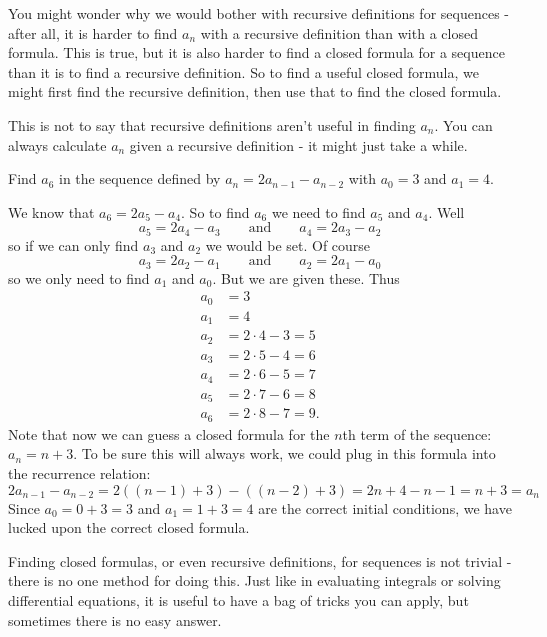 \documentclass[12pt]{article}
\begin{document}
You might wonder why we would bother with recursive definitions for sequences - after all, it is harder to find $a_n$ with a recursive definition than with a closed formula.  This is true, but it is also harder to find a closed formula for a sequence than it is to find a recursive definition.  So to find a useful closed formula, we might first find the recursive definition, then use that to find the closed formula.  

This is not to say that recursive definitions aren't useful in finding $a_n$.  You can always calculate $a_n$ given a recursive definition - it might just take a while.

\begin{example}
 Find $a_6$ in the sequence defined by $a_n = 2a_{n-1} - a_{n-2}$ with $a_0 = 3$ and $a_1 = 4$.  
 \begin{solution}
  We know that $a_6 = 2a_5 - a_4$.  So to find $a_6$ we need to find $a_5$ and $a_4$.  Well \[a_5 = 2a_4 - a_3 \qquad \mbox{and} \qquad a_4 = 2a_3 - a_2\]
  so if we can only find $a_3$ and $a_2$ we would be set.  Of course
  \[a_3 = 2a_2 - a_1 \qquad \mbox{and} \qquad a_2 = 2a_1 - a_0\]
  so we only need to find $a_1$ and $a_0$.  But we are given these.  Thus
  \begin{align*}
   a_0 & = 3 \\
   a_1 & = 4 \\
   a_2 & = 2\cdot 4 - 3 = 5\\
   a_3 & = 2\cdot 5 - 4 = 6\\
   a_4 & = 2\cdot 6 - 5 = 7\\
   a_5 & = 2\cdot 7 - 6 = 8\\
   a_6 & = 2\cdot 8 - 7 = 9.
  \end{align*}
 Note that now we can guess a closed formula for the $n$th term of the sequence: $a_n = n+3$.  To be sure this will always work, we could plug in this formula into the recurrence relation: \[2a_{n-1} - a_{n-2} = 2((n-1) + 3) - ((n-2) + 3) = 2n + 4 - n - 1 = n + 3 = a_n\]
 Since $a_0 = 0 + 3 = 3$ and $a_1 = 1+3 = 4$ are the correct initial conditions, we have lucked upon the correct closed formula.
 \end{solution}

\end{example}


Finding closed formulas, or even recursive definitions, for sequences is not trivial - there is no one method for doing this.  Just like in evaluating integrals or solving differential equations, it is useful to have a bag of tricks you can apply, but sometimes there is no easy answer.
\end{document}
